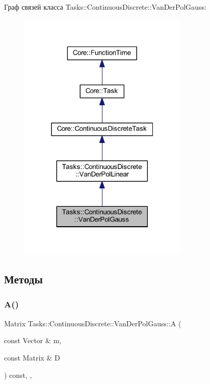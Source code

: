 Граф связей класса Tasks\+:\+:Continuous\+Discrete\+:\+:Van\+Der\+Pol\+Gauss\+:\nopagebreak
\begin{figure}[H]
\begin{center}
\leavevmode
\includegraphics[width=229pt]{class_tasks_1_1_continuous_discrete_1_1_van_der_pol_gauss__coll__graph}
\end{center}
\end{figure}


\subsection{Методы}
\hypertarget{class_tasks_1_1_continuous_discrete_1_1_van_der_pol_gauss_acb431d1a24b276610f6b7c7ff343fb9f}{}\label{class_tasks_1_1_continuous_discrete_1_1_van_der_pol_gauss_acb431d1a24b276610f6b7c7ff343fb9f} 
\subsubsection{\texorpdfstring{A()}{A()}}
{\footnotesize\ttfamily Matrix Tasks\+::\+Continuous\+Discrete\+::\+Van\+Der\+Pol\+Gauss\+::A (\begin{DoxyParamCaption}\item[{const Vector \&}]{m,  }\item[{const Matrix \&}]{D }\end{DoxyParamCaption}) const\hspace{0.3cm}{\ttfamily [override]}, {\ttfamily [protected]}, {\ttfamily [virtual]}}



